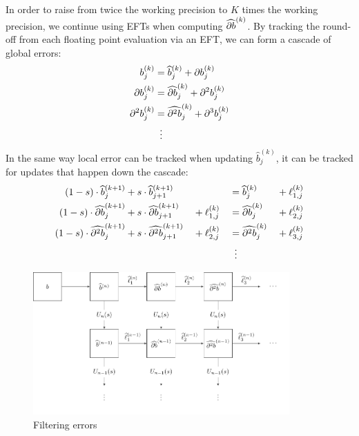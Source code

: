 \documentclass[3p, authoryear, square]{elsarticle}
\theoremstyle{definition}
\newcommand{\db}[1]{
  \ifthenelse{\equal{#1}{1}}
             {\partial b}
             {\partial^{#1} b}
}
\newcommand{\cdb}[1]{
  \ifthenelse{\equal{#1}{1}}
             {\widehat{\partial b}}
             {\widehat{\partial^{#1} b}}
}
\begin{document}
In order to raise from twice the working precision to \(K\) times the
working precision, we continue using EFTs when computing
\(\cdb{1}^{(k)}\). By tracking the round-off from each
floating point evaluation via an EFT, we can form a cascade of global errors:
\begin{align}
  b_j^{(k)} &= \widehat{b}_j^{(k)} + \db{1}_j^{(k)} \\
  \db{1}_j^{(k)} &= \cdb{1}_j^{(k)} + \db{2}_j^{(k)} \\
  \db{2}_j^{(k)} &= \cdb{2}_j^{(k)} +
  \db{3}_j^{(k)} \\
  &\mathrel{\makebox[\widthof{=}]{\vdots}} \nonumber
\end{align}
In the same way local error can be tracked when updating
\(\widehat{b}_j^{(k)}\), it can be tracked for updates that happen down
the cascade:
\begin{alignat}{4}
  (1 - s) \cdot \widehat{b}_j^{(k + 1)} &+
  s \cdot \widehat{b}_{j + 1}^{(k + 1)} &&  &&=
  \widehat{b}_j^{(k)} &&+ \ell_{1, j}^{(k)} \\
  (1 - s) \cdot \cdb{1}_j^{(k + 1)} &+
  s \cdot \cdb{1}_{j + 1}^{(k + 1)} &&+ \ell_{1, j}^{(k)} &&=
  \cdb{1}_j^{(k)} &&+ \ell_{2, j}^{(k)} \\
  (1 - s) \cdot \cdb{2}_j^{(k + 1)} &+
  s \cdot \cdb{2}_{j + 1}^{(k + 1)} &&+ \ell_{2, j}^{(k)} &&=
  \cdb{2}_j^{(k)} &&+ \ell_{3, j}^{(k)} \\
  &  &&  &&\mathrel{\makebox[\widthof{=}]{\vdots}} && \nonumber
\end{alignat}

\begin{figure}
  \includegraphics[width=0.875\textwidth]{tikz_filtration.pdf}
  \centering
  \captionsetup{width=.75\linewidth}
  \caption{Filtering errors}
  \label{fig:error-filtration}
\end{figure}
\end{document}
